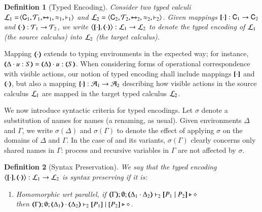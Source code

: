 \documentclass[preprint,11pt]{elsarticle}
\newtheorem{definition}{Definition}[section]
\begin{document}
{{\begin{definition}[Typed Encoding]%
\label{def:tenc}
        Consider two typed calculi
        $\mathcal{L}_1=\!\langle \mathsf{C}_1, {\cal{T}}_1, \xmapsto{~}_1, \approx_1, \vdash_1 \rangle$
        and
        $\mathcal{L}_2=\langle \mathsf{C}_2, {\cal{T}}_2, \xmapsto{~}_2, \approx_2, \vdash_2 \rangle$.
	Given mappings $[\!\![\cdot]\!\!]: \mathsf{C}_1 \to \mathsf{C}_2$ and
	$(\!\!\langle\cdot\rangle\!\!): {\cal{T}}_1 \to {\cal{T}}_2$, 
	we write 
		$\enco{\map{\cdot}, \mapt{\cdot}} : 
	\tyl{L}_1 \to \tyl{L}_2$ to denote the \emph{typed encoding} of $\mathcal{L}_1$ (the \emph{source calculus}) into $\mathcal{L}_2$ (the \emph{target  calculus}).
\end{definition}


Mapping $(\!\!\langle\cdot\rangle\!\!)$ extends to typing
environments in the expected way; for instance, $\mapt{\Delta \cat u:S} = \mapt{\Delta} \cat u:\mapt{S}$.
When considering forms of operational correspondence with visible actions, 
our notion of typed encoding shall include mappings $[\!\![\cdot]\!\!]$ and $(\!\!\langle\cdot\rangle\!\!)$, but also
a  mapping  $\{\!\!\{\cdot\}\!\!\}:\mathcal{A}_1 \to \mathcal{A}_2$ 
describing how visible actions in the source calculus $\mathcal{L}_1$ are mapped in the target typed calculus $\mathcal{L}_2$.


We now introduce syntactic criteria for typed encodings.
Let $\sigma$ denote a substitution of names for names (a renaming, as usual). Given environments $\Delta$ and $\Gamma$,
we write $\sigma(\Delta)$ and $\sigma(\Gamma)$ to denote the effect of applying $\sigma$ on the 
domains of $\Delta$ and $\Gamma$.
In the case of \HOp and its variants,  $\sigma(\Gamma)$ clearly concerns only shared names in $\Gamma$: process and recursive variables in $\Gamma$ are not affected by $\sigma$. 


\begin{definition}[Syntax Preservation]%
	\label{def:sep}
	We say that the
	typed encoding 
	$\enco{\map{\cdot}, \mapt{\cdot}}: \tyl{L}_1 \to \tyl{L}_2$ is \emph{syntax preserving}
	if it is:
	
	\begin{enumerate}[1.]
		\item	\emph{Homomorphic wrt parallel},   if 
		$\mapt{\Gamma}; \emptyset; \mapt{\Delta_1 \cat \Delta_2} \proves_2 \map{P_1 \Par P_2} \hastype \Proc$ \\
		then 
		$\mapt{\Gamma}; \emptyset; \mapt{\Delta_1} \cat \mapt{\Delta_2} \proves_2 \map{P_1} \Par \map{P_2} \hastype \Proc$.


\end{enumerate}
\end{definition}}}
\end{document}
